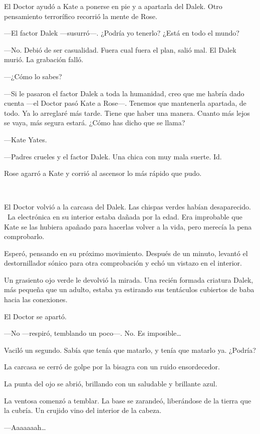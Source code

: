El Doctor ayudó a Kate a ponerse en pie y a apartarla del Dalek. Otro
pensamiento terrorífico recorrió la mente de Rose.

---El factor Dalek ---susurró---. ¿Podría yo tenerlo? ¿Está en todo el
mundo?

---No. Debió de ser casualidad. Fuera cual fuera el plan, salió mal. El
Dalek murió. La grabación falló.

---¿Cómo lo sabes?

---Si le pasaron el factor Dalek a toda la humanidad, creo que me habría
dado cuenta ---el Doctor pasó Kate a Rose---. Tenemos que mantenerla
apartada, de todo. Ya lo arreglaré más tarde. Tiene que haber una
manera. Cuanto más lejos se vaya, más segura estará. ¿Cómo has dicho que
se llama?

---Kate Yates.

---Padres crueles y el factor Dalek. Una chica con muy mala suerte. Id.

Rose agarró a Kate y corrió al ascensor lo más rápido que pudo.

~

El Doctor volvió a la carcasa del Dalek. Las chispas verdes habían
desaparecido. ~La electrónica en su interior estaba dañada por la edad.
Era improbable que Kate se las hubiera apañado para hacerlas volver a la
vida, pero merecía la pena comprobarlo.

Esperó, pensando en su próximo movimiento. Después de un minuto, levantó
el destornillador sónico para otra comprobación y echó un vistazo en el
interior.

Un grasiento ojo verde le devolvió la mirada. Una recién formada
criatura Dalek, más pequeña que un adulto, estaba ya estirando sus
tentáculos cubiertos de baba hacia las conexiones.

El Doctor se apartó.

---No ---respiró, temblando un poco---. No. Es imposible\ldots{}

Vaciló un segundo. Sabía que tenía que matarlo, y tenía que matarlo ya.
¿Podría?

La carcasa se cerró de golpe por la bisagra con un ruido ensordecedor.

La punta del ojo se abrió, brillando con un saludable y brillante azul.

La ventosa comenzó a temblar. La base se zarandeó, liberándose de la
tierra que la cubría. Un crujido vino del interior de la cabeza.

---Aaaaaaah\ldots{}

